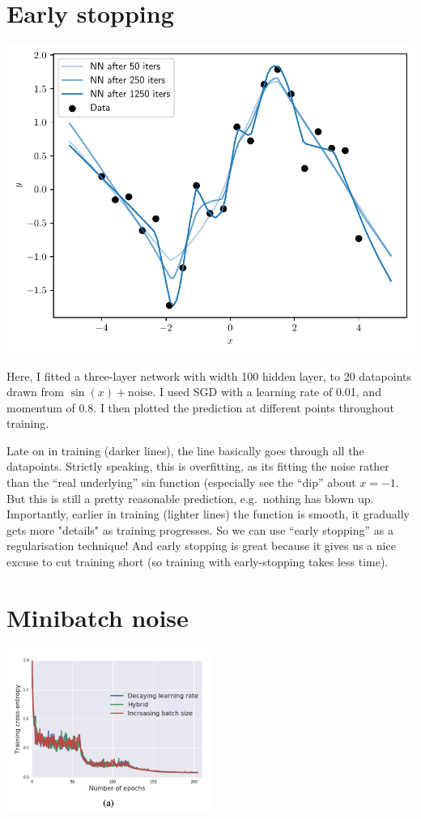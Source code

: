 \documentclass{article}
\newcommand{\0}{\mathbf{0}}
\begin{document}
\newpage
\section{Early stopping}

\includegraphics[width=\textwidth]{early_stopping.pdf}

Here, I fitted a three-layer network with width 100 hidden layer, to 20 datapoints drawn from $\sin(x) + \text{noise}$.
I used SGD with a learning rate of 0.01, and momentum of 0.8.
I then plotted the prediction at different points throughout training.

Late on in training (darker lines), the line basically goes through all the datapoints. Strictly speaking, this is overfitting, as its fitting the noise rather than the ``real underlying'' sin function (especially see the ``dip'' about $x=-1$.  
But this is still a pretty reasonable prediction, e.g.\ nothing has blown up.
Importantly, earlier in training (lighter lines) the function is smooth, it gradually gets more "details" as training progresses.
So we can use ``early stopping'' as a regularisation technique!
And early stopping is great because it gives us a nice excuse to cut training short (so training with early-stopping takes less time).

\newpage
\section{Minibatch noise}

\begin{center}
  \includegraphics[width=0.5\textwidth]{schedule.png}
\end{center}
\end{document}
